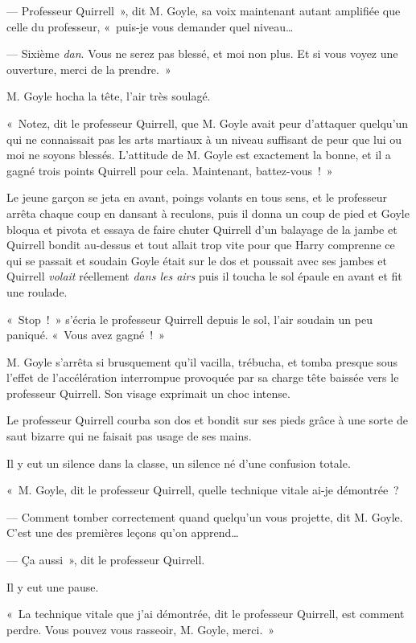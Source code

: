 --- Professeur Quirrell~», dit M. Goyle, sa voix maintenant autant amplifiée que celle du professeur, «~puis-je vous demander quel niveau…

--- Sixième \emph{dan}.
Vous ne serez pas blessé, et moi non plus.
Et si vous voyez une ouverture, merci de la prendre.~»

M. Goyle hocha la tête, l'air très soulagé.

«~Notez, dit le professeur Quirrell, que M. Goyle avait peur d'attaquer quelqu'un qui ne connaissait pas les arts martiaux à un niveau suffisant de peur que lui ou moi ne soyons blessés.
L'attitude de M. Goyle est exactement la bonne, et il a gagné trois points Quirrell pour cela.
Maintenant, battez-vous~!~»

Le jeune garçon se jeta en avant, poings volants en tous sens, et le professeur arrêta chaque coup en dansant à reculons, puis il donna un coup de pied et Goyle bloqua et pivota et essaya de faire chuter Quirrell d'un balayage de la jambe et Quirrell bondit au-dessus et tout allait trop vite pour que Harry comprenne ce qui se passait et soudain Goyle était sur le dos et poussait avec ses jambes et Quirrell \emph{volait} réellement \emph{dans les airs} puis il toucha le sol épaule en avant et fit une roulade.

«~Stop~!~»
 s'écria le professeur Quirrell depuis le sol, l'air soudain un peu paniqué.
«~Vous avez gagné~!~»

M. Goyle s'arrêta si brusquement qu'il vacilla, trébucha, et tomba presque sous l'effet de l'accélération interrompue provoquée par sa charge tête baissée vers le professeur Quirrell.
Son visage exprimait un choc intense.

Le professeur Quirrell courba son dos et bondit sur ses pieds grâce à une sorte de saut bizarre qui ne faisait pas usage de ses mains.

Il y eut un silence dans la classe, un silence né d'une confusion totale.

«~M. Goyle, dit le professeur Quirrell, quelle technique vitale ai-je démontrée~?

--- Comment tomber correctement quand quelqu'un vous projette, dit M. Goyle.
C'est une des premières leçons qu'on apprend…

--- Ça aussi~», dit le professeur Quirrell.

Il y eut une pause.

«~La technique vitale que j'ai démontrée, dit le professeur Quirrell, est comment perdre.
Vous pouvez vous rasseoir, M. Goyle, merci.~»


